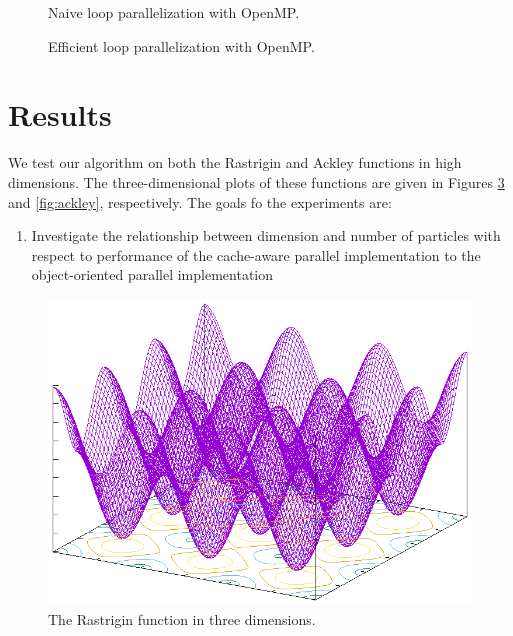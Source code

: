 \begin{figure}
  
  \caption{Naive loop parallelization with OpenMP.}\label{fig:naive-par}
\end{figure}

\begin{figure}
  
  \caption{Efficient loop parallelization with OpenMP.}\label{fig:efficient-par}
\end{figure}

\section{Results}\label{sec:results}
We test our algorithm on both the Rastrigin \cite{rastrigin} and Ackley \cite{ackley} functions
in high dimensions. The three-dimensional plots of these functions are given in Figures
\ref{fig:rastrigin} and \ref{fig:ackley}, respectively.  The goals fo the
experiments are:
\begin{enumerate}
  \item Investigate the relationship between dimension and number of particles
    with respect to performance of the cache-aware parallel implementation to
    the object-oriented parallel implementation
\end{enumerate}

\begin{figure}
  \includegraphics[width=\columnwidth]{../img/rastrigin}
  \caption{The Rastrigin function in three dimensions.}\label{fig:rastrigin}
\end{figure}

